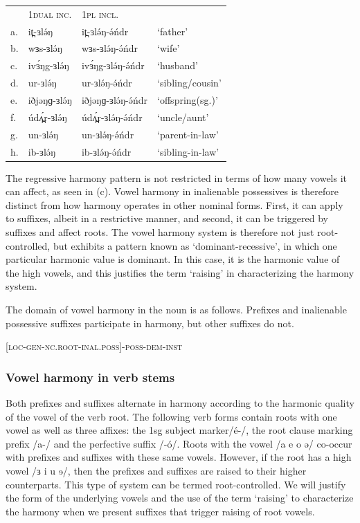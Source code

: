 \ea
\begin{tabular}[t]{llll}
&	1\textsc{dual inc}.	&	1\textsc{pl incl}.\\
a.	&	it̪-ɜlə́ŋ	&	it̪-ɜlə́ŋ-ə́ńdr  	&	‘father’\\
b.	&	wɜs-ɜlə́ŋ	&	wɜs-ɜlə́ŋ-ə́ńdr  	&	‘wife’\\
c.	&	ivɜ́ŋg-ɜlə́ŋ	&	ivɜ́ŋg-ɜlə́ŋ-ə́ńdr  	&	‘husband’\\
d.	&	ur-ɜlə́ŋ	&	ur-ɜlə́ŋ-ə́ńdr  	&	‘sibling/cousin’\\
e.	&	iðjəŋɡ-ɜlə́ŋ	&	iðjəŋɡ-ɜlə́ŋ-ə́ńdr  	&	‘offspring(sg.)’\\
f.	&	údʌ̪́r-ɜlə́ŋ	&	údʌ̪́r-ɜlə́ŋ-ə́ńdr  	&	‘uncle/aunt’\\
g.	&	un-ɜlə́ŋ	&	un-ɜlə́ŋ-ə́ńdr  	&	‘parent-in-law’\\
h.	&	ib-ɜlə́ŋ	&	ib-ɜlə́ŋ-ə́ńdr  	&	‘sibling-in-law’\\
\end{tabular}
\z

The regressive harmony pattern is not restricted in terms of how many vowels it can affect, as seen in (c). Vowel harmony in inalienable possessives is therefore distinct from how harmony operates in other nominal forms. First, it can apply to suffixes, albeit in a restrictive manner, and second, it can be triggered by suffixes and affect roots. The vowel harmony system is therefore not just root-controlled, but exhibits a pattern known as ‘dominant-recessive’, in which one particular harmonic value is dominant. In this case, it is the harmonic value of the high vowels, and this justifies the term ‘raising’ in characterizing the harmony system. 

The domain of vowel harmony in the noun is as follows. Prefixes and inalienable possessive suffixes participate in harmony, but other suffixes do not. 

\ea \textsc{[loc-gen-nc.root-inal.poss]-poss-dem-inst}
\z


\subsubsection{Vowel harmony in verb stems}
Both prefixes and suffixes alternate in harmony according to the harmonic quality of the vowel of the verb root. The following verb forms contain roots with one vowel as well as three affixes: the 1sg subject marker/é-/, the root clause marking prefix /a-/ and the perfective suffix /-ó/.  Roots with the vowel /a e o ə/ co-occur with prefixes and suffixes with these same vowels. However, if the root has a high vowel /ɜ i u ɘ/, then the prefixes and suffixes are raised to their higher counterparts. This type of system can be termed root-controlled. We will justify the form of the underlying vowels and the use of the term ‘raising’ to characterize the harmony when we present suffixes that trigger raising of root vowels. 

